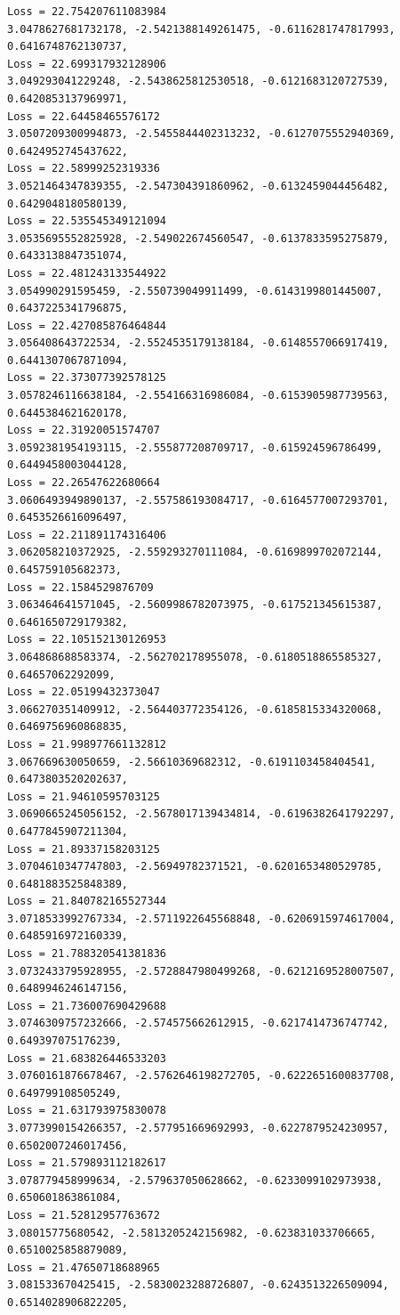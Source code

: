 \documentclass[11pt]{article}
\begin{document}
\begin{Verbatim}[commandchars=\\\{\}]
Loss = 22.754207611083984
3.0478627681732178, -2.5421388149261475, -0.6116281747817993,
0.6416748762130737,
Loss = 22.699317932128906
3.049293041229248, -2.5438625812530518, -0.6121683120727539, 0.6420853137969971,
Loss = 22.64458465576172
3.0507209300994873, -2.5455844402313232, -0.6127075552940369,
0.6424952745437622,
Loss = 22.58999252319336
3.0521464347839355, -2.547304391860962, -0.6132459044456482, 0.6429048180580139,
Loss = 22.535545349121094
3.0535695552825928, -2.549022674560547, -0.6137833595275879, 0.6433138847351074,
Loss = 22.481243133544922
3.054990291595459, -2.550739049911499, -0.6143199801445007, 0.6437225341796875,
Loss = 22.427085876464844
3.056408643722534, -2.5524535179138184, -0.6148557066917419, 0.6441307067871094,
Loss = 22.373077392578125
3.0578246116638184, -2.554166316986084, -0.6153905987739563, 0.6445384621620178,
Loss = 22.31920051574707
3.0592381954193115, -2.555877208709717, -0.615924596786499, 0.6449458003044128,
Loss = 22.26547622680664
3.0606493949890137, -2.557586193084717, -0.6164577007293701, 0.6453526616096497,
Loss = 22.211891174316406
3.062058210372925, -2.559293270111084, -0.6169899702072144, 0.645759105682373,
Loss = 22.1584529876709
3.063464641571045, -2.5609986782073975, -0.617521345615387, 0.6461650729179382,
Loss = 22.105152130126953
3.064868688583374, -2.562702178955078, -0.6180518865585327, 0.64657062292099,
Loss = 22.05199432373047
3.066270351409912, -2.564403772354126, -0.6185815334320068, 0.6469756960868835,
Loss = 21.998977661132812
3.067669630050659, -2.56610369682312, -0.6191103458404541, 0.6473803520202637,
Loss = 21.94610595703125
3.0690665245056152, -2.5678017139434814, -0.6196382641792297,
0.6477845907211304,
Loss = 21.89337158203125
3.0704610347747803, -2.56949782371521, -0.6201653480529785, 0.6481883525848389,
Loss = 21.840782165527344
3.0718533992767334, -2.5711922645568848, -0.6206915974617004,
0.6485916972160339,
Loss = 21.788320541381836
3.0732433795928955, -2.5728847980499268, -0.6212169528007507,
0.6489946246147156,
Loss = 21.736007690429688
3.0746309757232666, -2.574575662612915, -0.6217414736747742, 0.649397075176239,
Loss = 21.683826446533203
3.0760161876678467, -2.5762646198272705, -0.6222651600837708, 0.649799108505249,
Loss = 21.631793975830078
3.0773990154266357, -2.577951669692993, -0.6227879524230957, 0.6502007246017456,
Loss = 21.579893112182617
3.078779458999634, -2.579637050628662, -0.6233099102973938, 0.650601863861084,
Loss = 21.52812957763672
3.08015775680542, -2.5813205242156982, -0.623831033706665, 0.6510025858879089,
Loss = 21.47650718688965
3.081533670425415, -2.5830023288726807, -0.6243513226509094, 0.6514028906822205,

\end{Verbatim}
\end{document}

